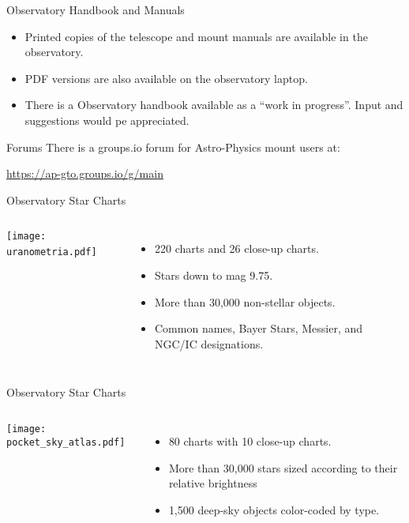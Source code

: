 \begin{frame}[t]{Observatory Handbook and Manuals}
  \Large
  \begin{itemize}
    \item Printed copies of the telescope and mount manuals are available in the observatory.
    \item PDF versions are also available on the observatory laptop.
    \item There is a Observatory handbook available as a ``work in progress''. Input and
     suggestions would pe appreciated.
    \end{itemize}
\end{frame}


\begin{frame}[t]{Forums}
  \Large
  There is a groups.io forum for Astro-Physics mount users at:

  \href{https://ap-gto.groups.io/g/main}{https://ap-gto.groups.io/g/main}
\end{frame}


\begin{frame}{Observatory Star Charts}
  \begin{columns}[T]
    \centering
      \texttt{[image: uranometria.pdf]}
    \ \\[1ex]
    \Large
    \begin{itemize}
      \item 220 charts and 26 close-up charts.
      \item Stars down to mag 9.75.
      \item More than 30,000 non-stellar objects.
      \item Common names, Bayer Stars, Messier, and NGC/IC designations.
      \end{itemize}
  \end{columns}
\end{frame}


\begin{frame}{Observatory Star Charts}
  \begin{columns}[T]
    \centering
      \texttt{[image: pocket\_sky\_atlas.pdf]}
    \ \\[1ex]
    \Large
    \begin{itemize}
      \item 80 charts with 10 close-up charts.
      \item More than 30,000 stars sized according to their relative brightness
      \item 1,500 deep-sky objects color-coded by type.
      \end{itemize}
  \end{columns}
\end{frame}

